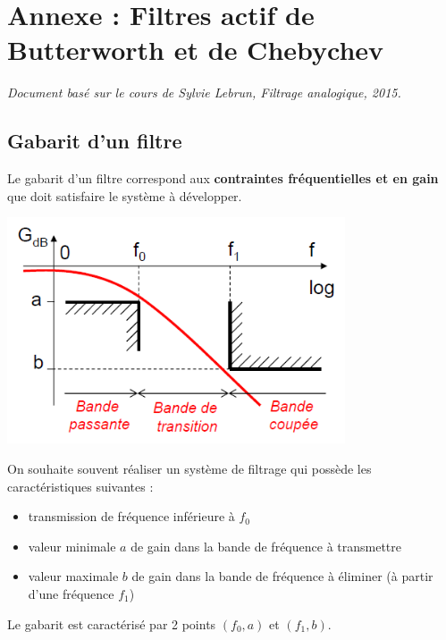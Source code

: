 \documentclass[a4paper,french]{paper}
\begin{document}





\newpage
\section*{Annexe : Filtres actif de \textbf{Butterworth} et de \textbf{Chebychev}}

\textit{Document basé sur le cours de Sylvie Lebrun, Filtrage analogique, 2015.}

\subsection*{Gabarit d'un filtre}

Le gabarit d'un filtre correspond aux \textbf{contraintes fréquentielles et en gain} que doit satisfaire le système à développer.

\begin{center}
	\includegraphics[width=10cm]{images/gabarit_filtre.png}
\end{center}

On souhaite souvent réaliser un système de filtrage qui possède les caractéristiques suivantes :
\begin{itemize}
	\item transmission de fréquence inférieure à $f_0$
	\item valeur minimale $a$ de gain dans la bande de fréquence à transmettre
	\item valeur maximale $b$ de gain dans la bande de fréquence à éliminer (à partir d'une fréquence $f_1$)
\end{itemize}

Le gabarit est caractérisé par 2 points $(f_0, a)$ et $(f_1, b)$.
\end{document}
